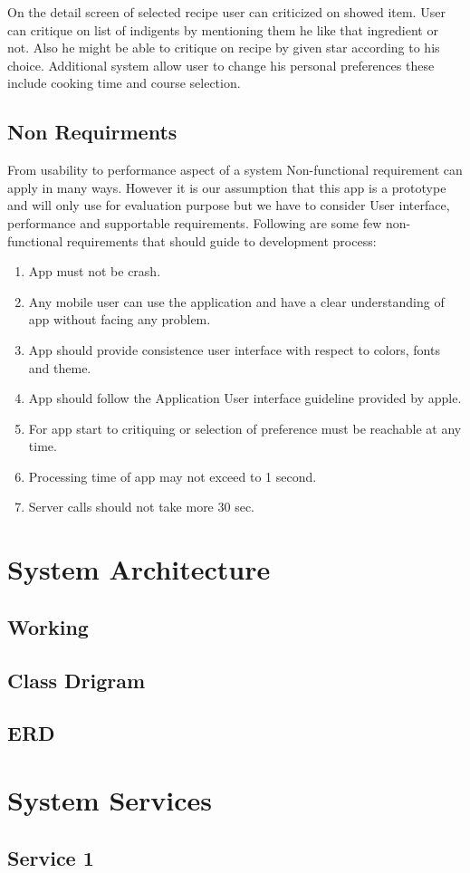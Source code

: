 On the detail screen of selected recipe user can criticized on showed item. User can critique on list of indigents by mentioning them he like that ingredient or not. Also he might be able to critique on recipe by given star according to his choice. Additional system allow user to change his personal preferences these include cooking time and course selection. \new 


\subsection{Non Requirments}

From usability to performance aspect of a system Non-functional requirement can apply in many ways. However it is our assumption that this app is a prototype and will only use for evaluation purpose but we have to consider User interface, performance and supportable requirements. Following are some few non-functional requirements that should guide to development process:

\begin{enumerate}

		\item App must not be crash.
	\item Any mobile user can use the application and have a clear understanding of app without facing any problem.
	\item App should provide consistence user interface with respect to colors, fonts and theme.
	\item App should follow the Application User interface guideline provided by apple.
	\item For app start to critiquing or selection of preference must be reachable at any time.
	\item Processing time of app may not exceed to 1 second. 
	\item Server calls should not take more 30 sec.

\end{enumerate}

\section{System Architecture}

\subsection{Working}

\subsection{Class Drigram}

\subsection{ERD}

\section{System Services}

\subsection{Service 1}
